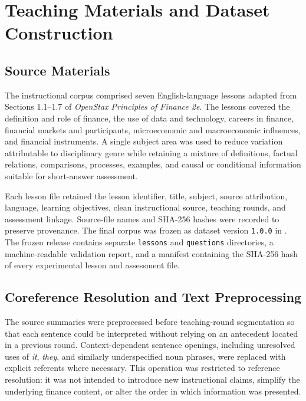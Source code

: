 \section{Teaching Materials and Dataset Construction}
\label{sec:teaching-materials-dataset}

\subsection{Source Materials}
\label{subsec:source-materials}

The instructional corpus comprised seven English-language lessons adapted from Sections 1.1--1.7 of \textit{OpenStax Principles of Finance 2e}. The lessons covered the definition and role of finance, the use of data and technology, careers in finance, financial markets and participants, microeconomic and macroeconomic influences, and financial instruments. A single subject area was used to reduce variation attributable to disciplinary genre while retaining a mixture of definitions, factual relations, comparisons, processes, examples, and causal or conditional information suitable for short-answer assessment.

Each lesson file retained the lesson identifier, title, subject, source attribution, language, learning objectives, clean instructional source, teaching rounds, and assessment linkage. Source-file names and SHA-256 hashes were recorded to preserve provenance. The final corpus was frozen as dataset version \texttt{1.0.0} in . The frozen release contains separate \texttt{lessons} and \texttt{questions} directories, a machine-readable validation report, and a manifest containing the SHA-256 hash of every experimental lesson and assessment file.

\subsection{Coreference Resolution and Text Preprocessing}
\label{subsec:coreference-preprocessing}

The source summaries were preprocessed before teaching-round segmentation so that each sentence could be interpreted without relying on an antecedent located in a previous round. Context-dependent sentence openings, including unresolved uses of \textit{it}, \textit{they}, and similarly underspecified noun phrases, were replaced with explicit referents where necessary. This operation was restricted to reference resolution: it was not intended to introduce new instructional claims, simplify the underlying finance content, or alter the order in which information was presented.

